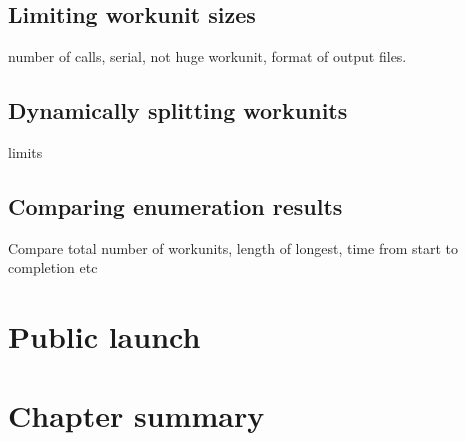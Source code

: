 \subsection{Limiting workunit sizes}
number of calls, serial, not huge workunit, format of output files.
\subsection{Dynamically splitting   workunits}
limits
\subsection{Comparing enumeration results}
Compare total number of workunits, length of longest, time from start to completion etc

\section{Public launch}

\section{Chapter summary}